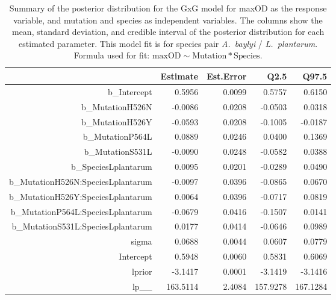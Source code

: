 \begin{table}[ht]
\centering
\begin{tabular}{rrrrr}
  \hline
 & Estimate & Est.Error & Q2.5 & Q97.5 \\ 
  \hline
b\_Intercept & 0.5956 & 0.0099 & 0.5757 & 0.6150 \\ 
  b\_MutationH526N & -0.0086 & 0.0208 & -0.0503 & 0.0318 \\ 
  b\_MutationH526Y & -0.0593 & 0.0208 & -0.1005 & -0.0187 \\ 
  b\_MutationP564L & 0.0889 & 0.0246 & 0.0400 & 0.1369 \\ 
  b\_MutationS531L & -0.0090 & 0.0248 & -0.0582 & 0.0388 \\ 
  b\_SpeciesLplantarum & 0.0095 & 0.0201 & -0.0289 & 0.0490 \\ 
  b\_MutationH526N:SpeciesLplantarum & -0.0097 & 0.0396 & -0.0865 & 0.0670 \\ 
  b\_MutationH526Y:SpeciesLplantarum & 0.0064 & 0.0396 & -0.0717 & 0.0819 \\ 
  b\_MutationP564L:SpeciesLplantarum & -0.0679 & 0.0416 & -0.1507 & 0.0141 \\ 
  b\_MutationS531L:SpeciesLplantarum & 0.0177 & 0.0414 & -0.0646 & 0.0989 \\ 
  sigma & 0.0688 & 0.0044 & 0.0607 & 0.0779 \\ 
  Intercept & 0.5948 & 0.0060 & 0.5831 & 0.6069 \\ 
  lprior & -3.1417 & 0.0001 & -3.1419 & -3.1416 \\ 
  lp\_\_ & 163.5114 & 2.4084 & 157.9278 & 167.1284 \\ 
   \hline
\end{tabular}
\caption{Summary of the posterior distribution for the GxG model for maxOD as the response variable, and mutation and species as independent variables. The columns show the mean, standard deviation, and credible interval of the posterior distribution for each estimated parameter. This model fit is for species pair \textit{A.~baylyi} / \textit{L.~plantarum}.  Formula used for fit: $\text{maxOD} \sim \text{Mutation} * \text{Species}$.} 
\label{supptab:GxG_maxOD_AB_LP}
\end{table}




